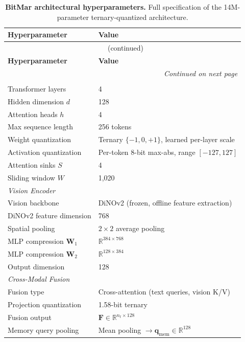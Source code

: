 \begin{longtable}{lp{6cm}}
\caption{\textbf{BitMar architectural hyperparameters.} Full specification of the 14M-parameter ternary-quantized architecture.}
\label{tab:bitmar_arch_hyperparams} \\
\toprule
\textbf{Hyperparameter} & \textbf{Value} \\
\midrule
\endfirsthead
\multicolumn{2}{c}{\tablename\ \thetable{} (continued)} \\
\toprule
\textbf{Hyperparameter} & \textbf{Value} \\
\midrule
\endhead
\midrule
\multicolumn{2}{r}{\textit{Continued on next page}} \\
\endfoot
\bottomrule
\endlastfoot
\multicolumn{2}{l}{\textit{Text Encoder}} \\
\quad Transformer layers & 4 \\
\quad Hidden dimension $d$ & 128 \\
\quad Attention heads $h$ & 4 \\
\quad Max sequence length & 256 tokens \\
\quad Weight quantization & Ternary $\{-1,0,+1\}$, learned per-layer scale \\
\quad Activation quantization & Per-token 8-bit max-abs, range $[-127,127]$ \\
\quad Attention sinks $S$ & 4 \\
\quad Sliding window $W$ & 1{,}020 \\
\midrule
\multicolumn{2}{l}{\textit{Vision Encoder}} \\
\quad Vision backbone & DiNOv2 (frozen, offline feature extraction) \\
\quad DiNOv2 feature dimension & 768 \\
\quad Spatial pooling & $2\times2$ average pooling \\
\quad MLP compression $\mathbf{W}_1$ & $\mathbb{R}^{384\times768}$ \\
\quad MLP compression $\mathbf{W}_2$ & $\mathbb{R}^{128\times384}$ \\
\quad Output dimension & 128 \\
\midrule
\multicolumn{2}{l}{\textit{Cross-Modal Fusion}} \\
\quad Fusion type & Cross-attention (text queries, vision K/V) \\
\quad Projection quantization & 1.58-bit ternary \\
\quad Fusion output & $\mathbf{F} \in \mathbb{R}^{n_t \times 128}$ \\
\quad Memory query pooling & Mean pooling $\rightarrow \mathbf{q}_{\text{mem}} \in \mathbb{R}^{128}$ \\

\end{longtable}
